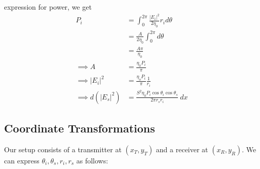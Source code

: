 \documentclass{article}
\begin{document}
expression for power, we get
\begin{align}
   P_i &= \int_0^{2 \pi} \frac{|E_i|^2}{2 \eta_0} r_i d \theta \nonumber \\
   &= \frac{A}{2 \eta_0} \int_0^{2 \pi} d \theta \nonumber \\ 
   &= \frac{A \pi}{\eta_0} \nonumber \\
   \implies A &= \frac{\eta_0 P_i}{\pi} \nonumber \\
   \implies |E_i|^2 &= \frac{\eta_o P_i}{\pi} \frac{1}{r_i} \nonumber \\
   \implies d(|E_s|^2) &= \frac{S^2 \eta_0 P_i \cos \theta_i \cos \theta_s }{2 \pi
      r_s r_i} \ dx
   \label{eq:fieldMagEq1}
\end{align}

\subsection*{Coordinate Transformations}
Our setup consists of a transmitter at $(x_T, y_T)$ and a receiver at 
$(x_R, y_R)$. We can express $\theta_i, \theta_s, r_i, r_s$ as follows:
\end{document}
